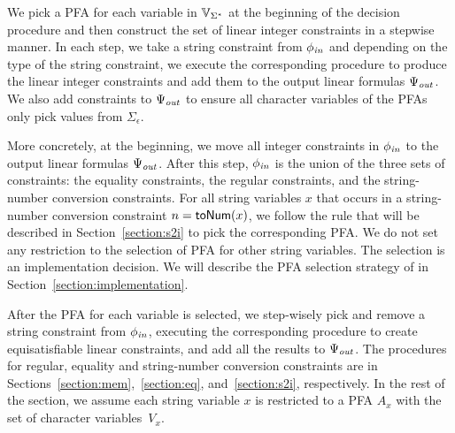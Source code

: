 \documentclass[sigplan,review,anonymous]{acmart}\settopmatter{printfolios=true,printccs=false,printacmref=false}
\begin{document}
We pick a PFA for each variable in $\mbox{$\mathbb{V}_{\Sigma^*}$}$ at the beginning of the decision procedure and then construct the set of linear integer constraints in a stepwise manner. In each step, we take a string constraint from $\phi_{\mathit{in}}$ and depending on the type of the string constraint, we execute the corresponding procedure to produce the linear integer constraints and add them to the output linear formulas $\Psi_{\mathit{out}}$. We also add constraints to $\Psi_{\mathit{out}}$ to ensure all character variables of the PFAs only pick values from $\Sigma_\epsilon$.

More concretely, at the beginning, we move all integer constraints in $\phi_{\mathit{in}}$ to the output linear formulas $\Psi_{\mathit{out}}$. After this step, $\phi_{\mathit{in}}$ is the union of the three sets of constraints: the equality constraints, the regular constraints, and the string-number conversion constraints. For all string variables $x$ that occurs in a string-number conversion constraint $n= \mbox{\textsf{toNum}($x$)}$, we follow the rule that will be described in Section~\ref{section:s2i} to pick the corresponding PFA. We do not set any restriction to the selection of PFA for other string variables. The selection is an implementation decision. We will describe the PFA selection strategy of {\tool} in Section~\ref{section:implementation}. 

After the PFA for each variable is selected, we step-wisely pick and remove a string constraint from $\phi_{\mathit{in}}$, executing the corresponding procedure to create equisatisfiable linear constraints, and add all the results to $\Psi_{\mathit{out}}$. The procedures for regular, equality and string-number conversion constraints are in Sections~\ref{section:mem},~\ref{section:eq}, and~\ref{section:s2i}, respectively. In the rest of the section, we assume each string variable $x$ is restricted to a PFA $A_x$ with the set of character variables~$V_x$.


 



\end{document}
